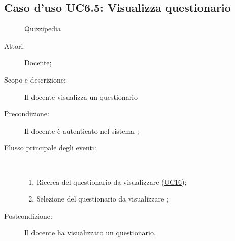 \subsection{Caso d'uso UC6.5: Visualizza questionario}
	\begin{figure}[H]
		\centering
		\begin{resizedtikzpicture}{\textwidth}
		\begin{umlsystem}[x=0, fill=lightgray!20]{Quizzipedia}
		\end{umlsystem}
		\end{resizedtikzpicture}
		\caption{}
	\end{figure}
\begin{description}
\item[Attori:] Docente;
\item[Scopo e descrizione:] Il docente visualizza un questionario
      \item[Precondizione:] Il docente è autenticato nel sistema
;

        \item[Flusso principale degli eventi:] \ 
 \begin{enumerate}
          \item Ricerca del questionario da visualizzare	 (\hyperlink{UC16}{UC16});
          \item Selezione del questionario da visualizzare	;

      \end{enumerate}
    \item[Postcondizione:] Il docente ha visualizzato un questionario.
  \end{description}
\hypertarget{UC7}{}
